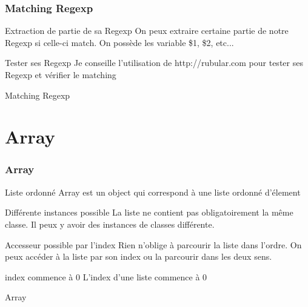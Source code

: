 \documentclass{beamer}
\begin{document}
\begin{frame}
  \frametitle{Matching Regexp}
  \begin{block}{Extraction de partie de sa Regexp}
    On peux extraire certaine partie de notre Regexp si celle-ci match. On possède les
    variable \$1, \$2, etc...
  \end{block}

  \begin{block}{Tester ses Regexp}
    Je conseille l'utilisation de http://rubular.com pour tester ses Regexp et
    v\'erifier le matching
  \end{block}
\end{frame}

\begin{frame}
  \begin{block}{Matching Regexp}
    
  \end{block}
\end{frame}


\section{Array}

\begin{frame}
  \frametitle{Array}
  \begin{block}{Liste ordonn\'e}
    Array est un object qui correspond à une liste ordonn\'e d'\'element
  \end{block}
  \begin{block}{Diff\'erente instances possible}
    La liste ne contient pas obligatoirement la même classe. Il peux y avoir des instances de classes diff\'erente.
  \end{block}
  \begin{block}{Accesseur possible par l'index}
    Rien n'oblige à parcourir la liste dans l'ordre. On peux acc\'eder à la liste par son index ou la parcourir dans les deux sens.
  \end{block}
  \begin{block}{index commence à 0}
    L'index d'une liste commence à 0
  \end{block}
\end{frame}

\begin{frame}
  \begin{beamerboxesrounded}{Array}
    
  \end{beamerboxesrounded}
\end{frame}
\end{document}
